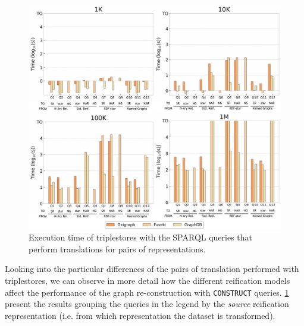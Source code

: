 
 


\begin{figure}[t!]
    \centering
    \includegraphics[width=\linewidth]{figures/chp6-1_results-queries.pdf}
    \caption{Execution time of triplestores with the SPARQL queries that perform translations for pairs of representations.}
    \label{fig:chp6-1_queries}
\end{figure}


Looking into the particular differences of the pairs of translation performed with triplestores, we can observe in more detail how the different reification models affect the performance of the graph re-construction with \texttt{CONSTRUCT} queries. \cref{fig:chp6-1_queries} present the results grouping the queries in the legend by the \textit{source} reification representation (i.e. from which representation the dataset is transformed). 


